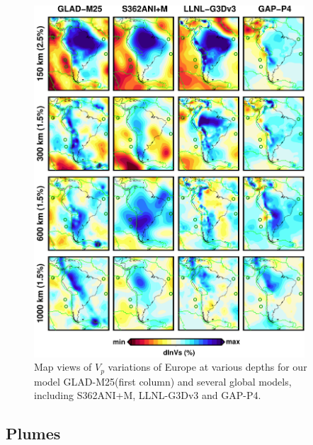 \documentclass[extra,mreferee]{gji}
\begin{document}
\begin{figure}
\includegraphics[width=0.9\textwidth]{figures/depth_slice/south_america_vp.pdf}
\caption{Map views of $V_p$ variations of Europe at various depths for our model GLAD-M25(first column) and several global models, including S362ANI+M, LLNL-G3Dv3 and GAP-P4.}
\label{fig:global-vp}
\centering
\end{figure}

\subsection{Plumes}

\end{document}
